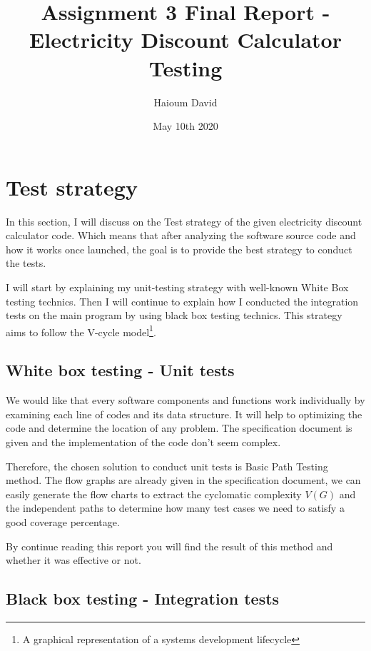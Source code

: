 \documentclass{article}
\title{Assignment 3 Final Report - Electricity Discount Calculator Testing}
\date{May 10th 2020}
\author{Haioum David}
\begin{document}
    \maketitle
    \doublespacing
	\tableofcontents
	\singlespacing
	\newpage


    \section{Test strategy}

    In this section, I will discuss on the Test strategy of the given
    electricity discount calculator code. Which means that after analyzing the software source code
    and how it works once launched, the goal is to provide the best strategy to conduct the tests.
    
    I will start by explaining my unit-testing strategy with well-known White Box testing technics. Then I will
    continue to explain how I conducted the integration tests on the main program by using black box testing technics. This
    strategy aims to follow the V-cycle model\footnote{A graphical representation of a systems development lifecycle}.

    \subsection{White box testing - Unit tests}

    We would like that every software components and functions work individually by examining each line
    of codes and its data structure. It will help to optimizing the code and determine the location of any problem. The specification
    document is given and the implementation of the code don't seem complex.

    Therefore, the chosen solution to conduct unit tests is Basic Path Testing method. The flow graphs are already given in the specification document,
    we can easily generate the flow charts to extract the cyclomatic complexity $V(G)$ and the independent paths to determine how many test cases we need to satisfy a good coverage percentage.

    By continue reading this report you will find the result of this method and whether it was effective or not.
     
    \subsection{Black box testing - Integration tests}
\end{document}
